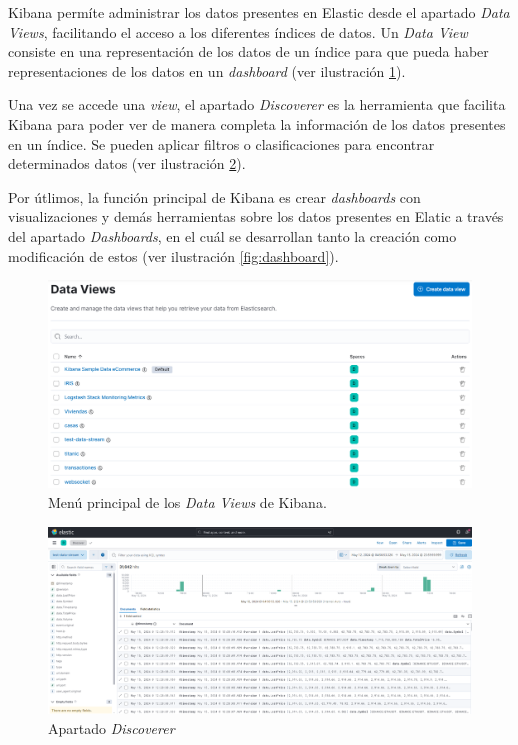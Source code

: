 Kibana permíte administrar los datos presentes en Elastic desde el apartado \textit{Data Views}, facilitando el acceso a los diferentes índices de datos. Un \textit{Data View} consiste en una representación de los datos de un índice para que pueda haber representaciones de los datos en un \textit{dashboard}  (ver ilustración  \ref{fig:dataviews}).

Una vez se accede una \textit{view}, el apartado \textit{Discoverer} es la herramienta que facilita Kibana para poder ver de manera completa la información de los datos presentes en un índice. Se pueden aplicar filtros o clasificaciones para encontrar determinados datos  (ver ilustración   \ref{fig:discoverer}).

Por útlimos, la función principal de Kibana es crear \textit{dashboards} con visualizaciones y demás herramientas sobre los datos presentes en Elatic a través del apartado \textit{Dashboards}, en el cuál se desarrollan tanto la creación como modificación de estos  (ver ilustración \ref{fig:dashboard}).

\begin{figure}
    \centering
    \includegraphics[width=1\linewidth]{img/views.png}
    \caption{Menú principal de los \textit{Data Views} de Kibana.}
    \label{fig:dataviews}
\end{figure}

\begin{figure}
    \centering
    \includegraphics[width=1\linewidth]{img/discoverer.png}
    \caption{Apartado \textit{Discoverer}}
    \label{fig:discoverer}
\end{figure}

